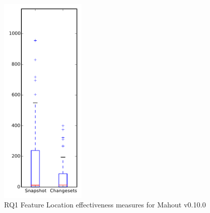 
\begin{figure}[t]
\centering
\includegraphics[width=0.36\textwidth]{figures/flt/rq1_mahout}
\caption{RQ1 Feature Location effectiveness measures for Mahout v0.10.0}
\label{fig:flt:rq1:mahout}
\end{figure}
